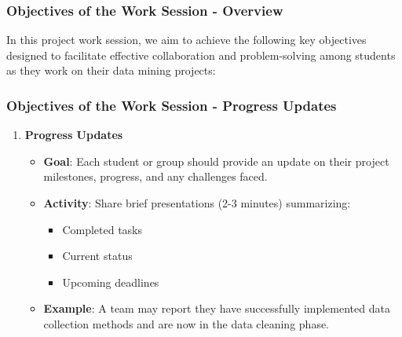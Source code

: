 \documentclass{beamer}
\begin{document}
\begin{frame}[fragile]
    \frametitle{Objectives of the Work Session - Overview}
    In this project work session, we aim to achieve the following key objectives designed to facilitate effective collaboration and problem-solving among students as they work on their data mining projects:
\end{frame}

\begin{frame}[fragile]
    \frametitle{Objectives of the Work Session - Progress Updates}
    \begin{enumerate}
        \item \textbf{Progress Updates}
        \begin{itemize}
            \item \textbf{Goal}: Each student or group should provide an update on their project milestones, progress, and any challenges faced.
            \item \textbf{Activity}: Share brief presentations (2-3 minutes) summarizing:
            \begin{itemize}
                \item Completed tasks
                \item Current status
                \item Upcoming deadlines
            \end{itemize}
            \item \textbf{Example}: A team may report they have successfully implemented data collection methods and are now in the data cleaning phase.
        \end{itemize}
    \end{enumerate}
\end{frame}
\end{document}
